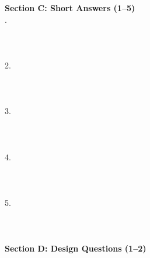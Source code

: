 \documentclass{CWNUExam}
\begin{document}
\vspace{0.6cm}
\noindent\textbf{Section C: Short Answers (1--5)}\\[0.2cm]
.\ \underline{\hspace{17cm}}\\[0.35cm]
\underline{\hspace{17cm}}\\[0.5cm]
\underline{\hspace{17cm}}\\[0.5cm]
\underline{\hspace{17cm}}\\[0.5cm]
2.\ \underline{\hspace{17cm}}\\[0.35cm]
\underline{\hspace{17cm}}\\[0.5cm]
\underline{\hspace{17cm}}\\[0.5cm]
\underline{\hspace{17cm}}\\[0.5cm]
3.\ \underline{\hspace{17cm}}\\[0.35cm]
\underline{\hspace{17cm}}\\[0.5cm]
\underline{\hspace{17cm}}\\[0.5cm]
\underline{\hspace{17cm}}\\[0.5cm]
4.\ \underline{\hspace{17cm}}\\[0.35cm]
\underline{\hspace{17cm}}\\[0.5cm]
\underline{\hspace{17cm}}\\[0.5cm]
\underline{\hspace{17cm}}\\[0.5cm]
5.\ \underline{\hspace{17cm}}\\[0.35cm]
\underline{\hspace{17cm}}\\[0.5cm]
\underline{\hspace{17cm}}\\[0.5cm]
\underline{\hspace{17cm}}\\[0.5cm]
\vspace{0.6cm}
\noindent\textbf{Section D: Design Questions (1--2)}\\[0.2cm]
\end{document}
